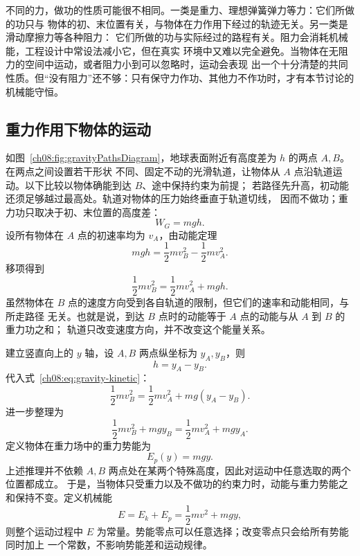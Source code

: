 {不同的力，做功的性质可能很不相同。一类是重力、理想弹簧弹力等力：它们所做的功只与
物体的初、末位置有关，与物体在力作用下经过的轨迹无关。另一类是滑动摩擦力等各种阻力：
它们所做的功与实际经过的路程有关。阻力会消耗机械能，工程设计中常设法减小它，但在真实
环境中又难以完全避免。当物体在无阻力的空间中运动，或者阻力小到可以忽略时，运动会表现
出一个十分清楚的共同性质。但“没有阻力”还不够：只有保守力作功、其他力不作功时，才有本节讨论的机械能守恒。

\subsection{重力作用下物体的运动}

如图~\ref{ch08:fig:gravityPathsDiagram}，地球表面附近有高度差为 $h$ 的两点 $A,B$。在两点之间设置若干形状
不同、固定不动的光滑轨道，让物体从 $A$ 点沿轨道运动。以下比较以物体确能到达 $B$、途中保持约束为前提；
若路径先升高，初动能还须足够越过最高处。轨道对物体的压力始终垂直于轨道切线，
因而不做功；重力功只取决于初、末位置的高度差：
\gravityPathsDiagram
\begin{equation}
 W_G=mgh .
\end{equation}
设所有物体在 $A$ 点的初速率均为 $v_A$，由动能定理
\begin{equation}
 mgh=\frac12mv_B^2-\frac12mv_A^2.
\end{equation}
移项得到
\begin{equation}
 \frac12mv_B^2=\frac12mv_A^2+mgh.\label{ch08:eq:gravity-kinetic}
\end{equation}
虽然物体在 $B$ 点的速度方向受到各自轨道的限制，但它们的速率和动能相同，与所走路径
无关。也就是说，到达 $B$ 点时的动能等于 $A$ 点的动能与从 $A$ 到 $B$ 的重力功之和；
轨道只改变速度方向，并不改变这个能量关系。

建立竖直向上的 $y$ 轴，设 $A,B$ 两点纵坐标为 $y_A,y_B$，则
\begin{equation}
 h=y_A-y_B.
\end{equation}
代入式~\eqref{ch08:eq:gravity-kinetic}：
\begin{equation}
 \frac12mv_B^2=\frac12mv_A^2+mg(y_A-y_B).
\end{equation}
进一步整理为
\begin{equation}
 \frac12mv_B^2+mgy_B
 =\frac12mv_A^2+mgy_A.
\end{equation}
定义物体在重力场中的重力势能为
\begin{equation}
 E_p(y)=mgy.\label{ch08:eq:gravity-potential}
\end{equation}
上述推理并不依赖 $A,B$ 两点处在某两个特殊高度，因此对运动中任意选取的两个位置都成立。
于是，当物体只受重力以及不做功的约束力时，动能与重力势能之和保持不变。定义机械能
\begin{equation}
 E=E_k+E_p=\frac12mv^2+mgy,
\end{equation}
则整个运动过程中 $E$ 为常量。势能零点可以任意选择；改变零点只会给所有势能同时加上
一个常数，不影响势能差和运动规律。

}
